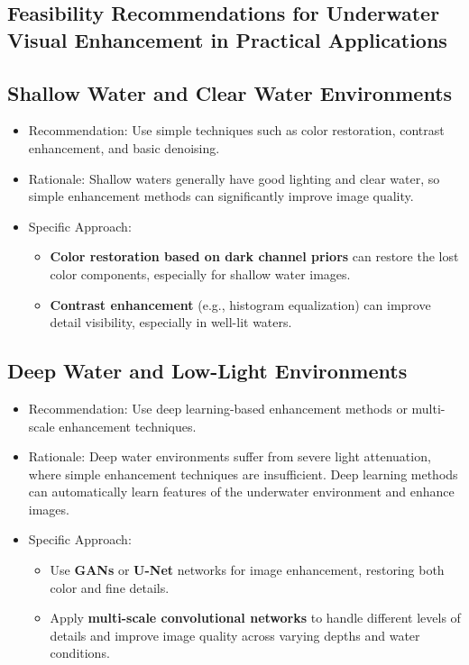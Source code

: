 \documentclass[withoutpreface,bwprint]{cumcmthesis}
\begin{document}
\subsection{Feasibility Recommendations for Underwater Visual Enhancement in Practical Applications}

\subsection{Shallow Water and Clear Water Environments}

\begin{itemize}
    \item Recommendation: Use simple techniques such as color restoration, contrast enhancement, and basic denoising.

    \item Rationale: Shallow waters generally have good lighting and clear water, so simple enhancement methods can significantly improve image quality.

    \item Specific Approach:
        \begin{itemize}
            \item \textbf{Color restoration based on dark channel priors} can restore the lost color components, especially for shallow water images.

            \item \textbf{Contrast enhancement} (e.g., histogram equalization) can improve detail visibility, especially in well-lit waters.
        \end{itemize}
\end{itemize}

\subsection{Deep Water and Low-Light Environments}

\begin{itemize}
    \item Recommendation: Use deep learning-based enhancement methods or multi-scale enhancement techniques.

    \item Rationale: Deep water environments suffer from severe light attenuation, where simple enhancement techniques are insufficient. Deep learning methods can automatically learn features of the underwater environment and enhance images.

    \item Specific Approach:
        \begin{itemize}
            \item Use \textbf{GANs} or \textbf{U-Net} networks for image enhancement, restoring both color and fine details.

            \item  Apply \textbf{multi-scale convolutional networks} to handle different levels of details and improve image quality across varying depths and water conditions.
        \end{itemize}
\end{itemize}
\end{document}
